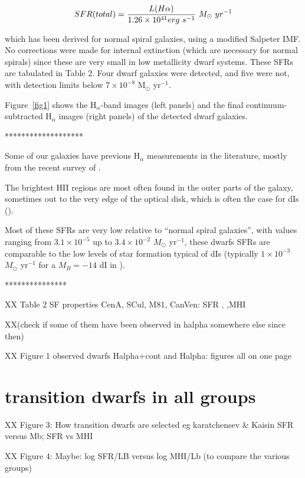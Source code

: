 \documentclass[12pt,preprint]{emulateapj}
\begin{document}
\begin{equation}
SFR(total) = {{L(H\alpha )}\over{1.26\times 10^{41} erg\  s^{-1}}}\
M_\odot\  yr^{-1}
\end{equation}

which has been derived for normal spiral galaxies, using a modified Salpeter IMF.  No corrections were made for internal extinction (which are necessary 
for normal spirals) since these are very small in low metallicity dwarf systems. These SFRs are tabulated in Table 2.
Four dwarf galaxies were detected, and five were not, with detection limits below $7\times 10^{-8}$ M$_{\odot}$ yr$^{-1}$.

Figure~\ref{fig1} shows the H$_\alpha$-band images (left panels) and the final continuum-subtracted H$_\alpha$ images (right panels) of the detected 
dwarf galaxies. 
 

*******************


Some of our galaxies have previous H$_\alpha$ measurements in the literature, mostly from the recent survey of \cite{kl08}. 

The brightest HII regions are most often found in the outer parts of the galaxy, sometimes out to the very edge of the optical disk, which is often the case 
for dIs (\cite{bha98}). 

Most of these SFRs are very low relative to ``normal spiral galaxies'', with values ranging from $3.1\times 10^{-5}$ up to 
$3.4\times 10^{-2}$ $M_{\odot}$ yr$^{-1}$, these dwarfs SFRs are comparable to the low levels of star formation typical of dIs (typically 
$1\times 10^{-3}$ $M_{\odot}$ yr$^{-1}$ for a $M_B=-14$ dI in \cite{kk07}). 



***************

XX Table 2 SF properties CenA, SCul, M81, CanVen: SFR , ,MHI 
 
XX(check if some of them have been observed in halpha somewhere else since then)

XX Figure 1 observed dwarfs Halpha+cont and Halpha:  figures all on one page

\section{transition dwarfs in all groups}

XX Figure 3: How transition dwarfs are selected eg karatchensev \& Kaisin SFR versus Mb; SFR vs MHI
 
XX Figure 4: Maybe: log SFR/LB versus log MHI/Lb (to compare the various groups)
\end{document}
